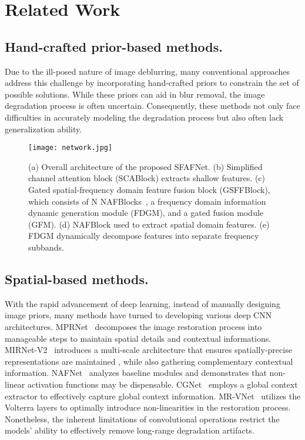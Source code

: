 \section{Related Work}
\subsection{Hand-crafted prior-based methods.}
Due to the ill-posed nature of image deblurring, many conventional approaches~\cite{2011Image,karaali2017edge} address this challenge by incorporating hand-crafted priors to constrain the set of possible solutions. While these priors can aid in blur removal, the image degradation process is often uncertain. Consequently, these methods not only face difficulties in accurately modeling the degradation process but also often lack generalization ability.

\begin{figure*}
    \centering
    \texttt{[image: network.jpg]}
    \caption{(a) Overall architecture of the proposed SFAFNet. (b) Simplified channel attention block (SCABlock) extracts shallow features.   (c) Gated spatial-frequency domain feature fusion block (GSFFBlock), which consists of N NAFBlocks~\cite{chen2022simple}, a frequency domain information dynamic generation module (FDGM), and a gated fusion module (GFM). (d) NAFBlock used to extract spatial domain features. (e) FDGM dynamically decompose features into separate frequency subbands.}
    \label{fig:network}
\end{figure*}
\subsection{Spatial-based methods.}
With the rapid advancement of deep learning, instead of manually designing image priors, many methods have turned to developing various deep CNN architectures. MPRNet~\cite{Zamir2021MPRNet} decomposes the image restoration process into manageable steps to maintain spatial details and contextual informations.
MIRNet-V2~\cite{Zamir2022MIRNetv2} introduces a multi-scale architecture that ensures spatially-precise representations are maintained , while also gathering complementary contextual information.
NAFNet~\cite{chen2022simple} analyzes baseline modules and demonstrates that non-linear activation functions may be dispensable.
CGNet~\cite{CascadedGaze} employs a global context extractor to effectively capture global context information.
MR-VNet~\cite{MR-VNet} utilizes the Volterra layers to optimally introduce non-linearities in the restoration process. 
Nonetheless,  the inherent limitations of convolutional operations restrict the models' ability to effectively remove long-range degradation artifacts.


